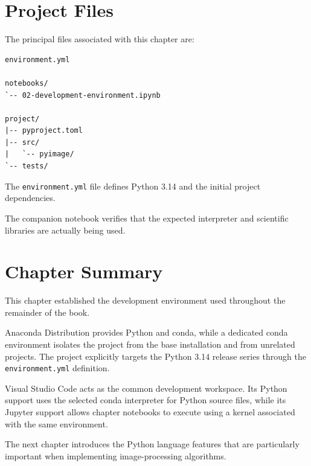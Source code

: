 \section{Project Files}
\label{sec:ch02-project-files}

\begin{projectfiles}

The principal files associated with this chapter are:

\begin{verbatim}
environment.yml

notebooks/
`-- 02-development-environment.ipynb

project/
|-- pyproject.toml
|-- src/
|   `-- pyimage/
`-- tests/
\end{verbatim}

The \texttt{environment.yml} file defines Python 3.14 and the initial
project dependencies.

The companion notebook verifies that the expected interpreter and
scientific libraries are actually being used.

\end{projectfiles}


\section{Chapter Summary}
\label{sec:ch02-summary}

This chapter established the development environment used throughout
the remainder of the book.

Anaconda Distribution provides Python and conda, while a dedicated
conda environment isolates the project from the base installation and
from unrelated projects. The project explicitly targets the Python
3.14 release series through the \texttt{environment.yml} definition.

Visual Studio Code acts as the common development workspace. Its
Python support uses the selected conda interpreter for Python source
files, while its Jupyter support allows chapter notebooks to execute
using a kernel associated with the same environment.

The next chapter introduces the Python language features that are
particularly important when implementing image-processing algorithms.

